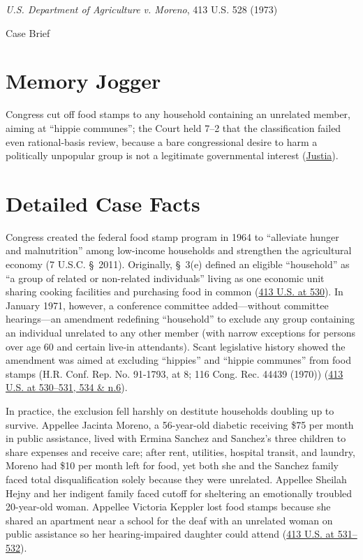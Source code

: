 \documentclass[12pt]{article}
\begin{document}
\begin{center}
{\LARGE \textit{U.S. Department of Agriculture v. Moreno}, 413 U.S. 528 (1973)\par}
\vspace{0.8em}
{\large Case Brief\par}
\end{center}
\vspace{1em}

\section{Memory Jogger}
Congress cut off food stamps to any household containing an unrelated member, aiming at ``hippie communes''; the Court held 7--2 that the classification failed even rational-basis review, because a bare congressional desire to harm a politically unpopular group is not a legitimate governmental interest (\href{https://supreme.justia.com/cases/federal/us/413/528/}{Justia}).

\section{Detailed Case Facts}
Congress created the federal food stamp program in 1964 to ``alleviate hunger and malnutrition'' among low-income households and strengthen the agricultural economy (7 U.S.C. \S~2011). Originally, \S~3(e) defined an eligible ``household'' as ``a group of related or non-related individuals'' living as one economic unit sharing cooking facilities and purchasing food in common (\href{https://supreme.justia.com/cases/federal/us/413/528/}{413 U.S. at 530}). In January 1971, however, a conference committee added---without committee hearings---an amendment redefining ``household'' to exclude any group containing an individual unrelated to any other member (with narrow exceptions for persons over age 60 and certain live-in attendants). Scant legislative history showed the amendment was aimed at excluding ``hippies'' and ``hippie communes'' from food stamps (H.R. Conf. Rep. No. 91-1793, at 8; 116 Cong. Rec. 44439 (1970)) (\href{https://supreme.justia.com/cases/federal/us/413/528/}{413 U.S. at 530--531, 534 \& n.6}).

In practice, the exclusion fell harshly on destitute households doubling up to survive. Appellee Jacinta Moreno, a 56-year-old diabetic receiving \$75 per month in public assistance, lived with Ermina Sanchez and Sanchez's three children to share expenses and receive care; after rent, utilities, hospital transit, and laundry, Moreno had \$10 per month left for food, yet both she and the Sanchez family faced total disqualification solely because they were unrelated. Appellee Sheilah Hejny and her indigent family faced cutoff for sheltering an emotionally troubled 20-year-old woman. Appellee Victoria Keppler lost food stamps because she shared an apartment near a school for the deaf with an unrelated woman on public assistance so her hearing-impaired daughter could attend (\href{https://supreme.justia.com/cases/federal/us/413/528/}{413 U.S. at 531--532}).
\end{document}
